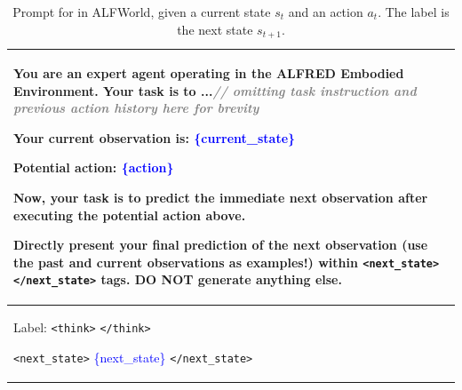 \begin{table}[t!]
    \caption{Prompt for \wmsftshort{} in ALFWorld, given a current state $s_t$ and an action $a_t$. The label is the next state $s_{t+1}$.}
    \label{tab:alfred_wmsft_prompt}
    \begin{tabular}{p{16.5cm}}
    \toprule
    You are an expert agent operating in the ALFRED Embodied Environment. Your task is to ...\emph{\textcolor{gray}{// omitting task instruction and previous action history here for brevity}}
    \newline

    Your current observation is:
    \textcolor{blue}{\{}\textcolor{blue}{current\_state}\textcolor{blue}{\}}


    \textbf{Potential action:}
    \textcolor{blue}{\{}\textcolor{blue}{action}\textcolor{blue}{\}}
    \newline

    Now, your task is to predict the immediate next observation after executing the potential action above.

    Directly present your final prediction of the next observation (use the past and current observations as examples!) within \texttt{<next\_state>} \texttt{</next\_state>} tags. DO NOT generate anything else.
    \\
    \midrule
    Label: \texttt{<think>} \texttt{</think>}

    \texttt{<next\_state>} \textcolor{blue}{\{}\textcolor{blue}{next\_state}\textcolor{blue}{\}} \texttt{</next\_state>}
    \\
    \bottomrule
    \end{tabular}
\end{table}